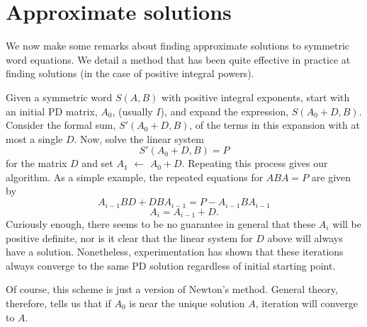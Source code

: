 \documentclass{amsart}
\theoremstyle{definition}
\theoremstyle{remark}
\numberwithin{equation}{section}
\newcommand{\<}{\langle}
\renewcommand{\>}{\rangle}
\begin{document}
\section{Approximate solutions}

We now make some remarks about finding approximate solutions to
symmetric word equations.  We detail a method that has been quite
effective in practice at finding solutions (in the case of
positive integral powers).

Given a symmetric word $S(A,B)$ with positive integral exponents,
start with an initial PD matrix, $A_{0}$, (usually $I$), and
expand the expression, $S(A_{0}+D,B)$.  Consider the formal sum,
$S'(A_{0}+D,B)$, of the terms in this expansion with at most a
single $D$. Now, solve the linear system \[S'(A_{0}+D,B) = P\] for
the matrix $D$ and set $A_{1}$ $ \leftarrow$ $A_{0} + D$.
Repeating this process gives our algorithm.  As a simple example,
the repeated equations for $ABA = P$ are given by
\[A_{i-1}BD + DBA_{i-1} = P - A_{i-1}BA_{i-1}\] \[A_{i} = A_{i-1}
+ D.\]  Curiously enough, there seems to be no guarantee in
general that these $A_{i}$ will be positive definite, nor is it
clear that the linear system for $D$ above will always have a
solution.  Nonetheless, experimentation has shown that these
iterations always converge to the same PD solution regardless of
initial starting point.

Of course, this scheme is just a version of Newton's method.
General theory, therefore, tells us that if $A_0$ is near the
unique solution $A$, iteration will converge to $A$.
\end{document}
